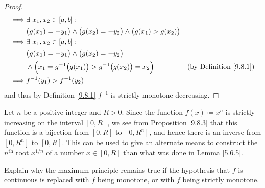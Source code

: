 \begin{proof}
\begin{align*}
        \implies & \exists\ x_1, x_2 \in [a, b] :                                                                                               \\
                 & \big(g(x_1) = -y_1\big) \land \big(g(x_2) = -y_2\big) \land \big(g(x_1) > g(x_2)\big)                                        \\
        \implies & \exists\ x_1, x_2 \in [a, b] :                                                                                               \\
                 & \big(g(x_1) = -y_1\big) \land \big(g(x_2) = -y_2\big)                                                                        \\
                 & \land \Big(x_1 = g^{-1}\big(g(x_1)\big) > g^{-1}\big(g(x_2)\big) = x_2\Big)             & \text{(by Definition \ref{9.8.1})} \\
        \implies & f^{-1}(y_1) > f^{-1}(y_2)
    \end{align*}
    and thus by Definition \ref{9.8.1} \(f^{-1}\) is strictly monotone decreasing.
\end{proof}

\begin{example}\label{9.8.4}
    Let \(n\) be a positive integer and \(R > 0\).
    Since the function \(f(x) \coloneqq x^n\) is strictly increasing on the interval \([0, R]\), we see from Proposition \ref{9.8.3} that this function is a bijection from \([0, R]\) to \([0, R^n]\), and hence there is an inverse from \([0, R^n]\) to \([0, R]\).
    This can be used to give an alternate means to construct the \(n^\text{th}\) root \(x^{1 / n}\) of a number \(x \in [0, R]\) than what was done in Lemma \ref{5.6.5}.
\end{example}

\exercisesection

\begin{exercise}\label{ex 9.8.1}
    Explain why the maximum principle remains true if the hypothesis that \(f\) is continuous is replaced with \(f\) being monotone, or with \(f\) being strictly monotone.
\end{exercise}

